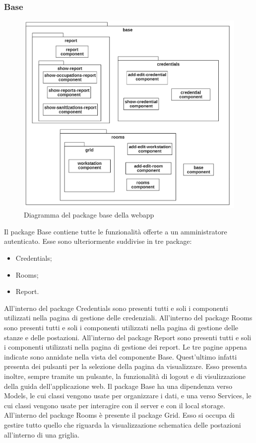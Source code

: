 \subsubsection{Base}
\begin{figure}[H]
	\centering
	\includegraphics[width=13cm]{res/images/webapp-base-diagrammaPackage.png}
	\caption{Diagramma del package base della webapp}
	\label{fig:DiagrammaPackageBaseWebapp}
\end{figure}
Il package Base contiene tutte le funzionalità offerte a un amministratore autenticato.
Esse sono ulteriormente suddivise in tre package:
\begin{itemize}
\item Credentials;
\item Rooms;
\item Report.
\end{itemize}
All'interno del package Credentials sono presenti tutti e soli i componenti utilizzati nella pagina di gestione delle credenziali. All'interno del package Rooms sono presenti tutti e soli i componenti utilizzati nella pagina di gestione delle stanze e delle postazioni. All'interno del package Report sono presenti tutti e soli i componenti utilizzati nella pagina di gestione dei report. Le tre pagine appena indicate sono annidate nella vista del componente Base. Quest'ultimo infatti presenta dei pulsanti per la selezione della pagina da visualizzare. Esso presenta inoltre, sempre tramite un pulsante, la funzionalità di logout e di visulizzazione della guida dell'applicazione web. \newline
Il package Base ha una dipendenza verso Models, le cui classi vengono usate per organizzare i dati, e una verso Services, le cui classi vengono usate per interagire con il server e con il local storage.
All'interno del package Rooms è presente il package Grid. Esso si occupa di gestire tutto quello che riguarda la visualizzazione schematica delle postazioni all'interno di una griglia.



